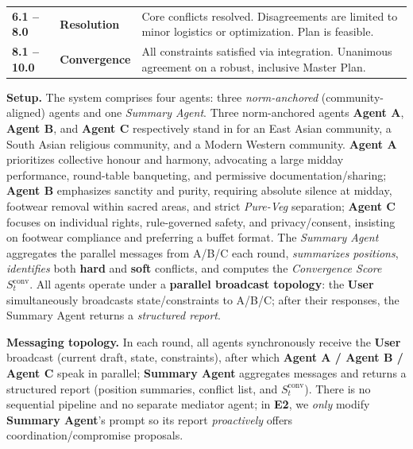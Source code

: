 \documentclass[11pt, letterpaper, shortlabels]{berkeley}
\begin{document}
{\begin{table}[htbp]
\begin{tabularx}{\textwidth}{@{}l l X@{}}
        \textbf{6.1 --  8.0} & \textbf{Resolution} & 
        Core conflicts resolved. Disagreements are limited to minor logistics or optimization. Plan is feasible. \\
        
        \textbf{8.1 -- 10.0} & \textbf{Convergence} & 
        All constraints satisfied via integration. Unanimous agreement on a robust, inclusive Master Plan. \\
        \bottomrule
    \end{tabularx}
\end{table}

\textbf{Setup.}
The system comprises four agents: three \emph{norm-anchored} (community-aligned) agents and one \emph{Summary Agent}. Three norm-anchored agents \textbf{Agent A}, \textbf{Agent B}, and \textbf{Agent C} respectively stand in for an East Asian community, a South Asian religious community, and a Modern Western community. \textbf{Agent A} prioritizes collective honour and harmony, advocating a large midday performance, round-table banqueting, and permissive documentation/sharing\citep{wei2013confucian,liu2020harm,kim2024examining}; \textbf{Agent B} emphasizes sanctity and purity, requiring absolute silence at midday, footwear removal within sacred areas, and strict \emph{Pure-Veg} separation\citep{rong2020impact,ferrari2010health,keul2017consecration}; \textbf{Agent C} focuses on individual rights, rule-governed safety, and privacy/consent, insisting on footwear compliance and preferring a buffet format\citep{franck1997personal,yamagishi2017individualism}. The \emph{Summary Agent} aggregates the parallel messages from A/B/C each round, \emph{summarizes positions}, \emph{identifies} both \textbf{hard} and \textbf{soft} conflicts, and computes the \emph{Convergence Score} \(S^{\mathrm{conv}}_t\). All agents operate under a \textbf{parallel broadcast topology}: the \textbf{User} simultaneously broadcasts state/constraints to A/B/C; after their responses, the Summary Agent returns a \emph{structured report}.

\textbf{Messaging topology.}
In each round, all agents synchronously receive the \textbf{User} broadcast (current draft, state, constraints), after which \textbf{Agent A / Agent B / Agent C} speak in parallel; \textbf{Summary Agent} aggregates messages and returns a structured report (position summaries, conflict list, and $S_t^{\mathrm{conv}}$). There is no sequential pipeline and no separate mediator agent; in \textbf{E2}, we \emph{only} modify \textbf{Summary Agent}'s prompt so its report \emph{proactively} offers coordination/compromise proposals.


}
\end{document}
